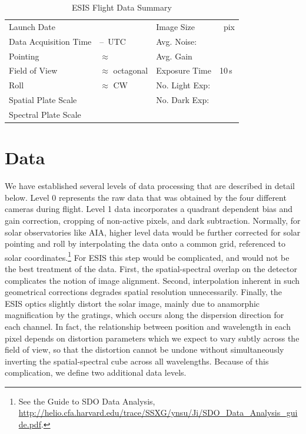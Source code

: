 		\begin{table}
		\begin{center}
			\caption{ESIS Flight Data Summary}
			\label{tab:data_info}
			\begin{tabular}{ll|ll}\hline
				Launch Date & \dateMission & Image Size  & \imageShape~pix\\
				Data Acquisition Time & \timeDataStart--\timeDataStop~UTC & Avg. Noise: & \readoutNoise\tablenotemark{a}\\ 
			    Pointing   &  $\approx$ \esispointing & Avg. Gain &   \gain \\
				Field of View  & $\approx$ \esisfov octagonal  & Exposure Time & 10\,s \\
				Roll & $\approx$ \esisroll CW & No. Light Exp: &\numDataFrames\\
			    Spatial  Plate Scale  &  \plateScale & No. Dark Exp: &\numDarkFrames \\
				Spectral  Plate Scale  &  \dispersion & \\
					\hline
			\end{tabular}
		\end{center}
		\end{table}
		
		



	
\section{Data} 

We have established several levels of data processing that are described in detail below.
Level 0 represents the raw data that was obtained by the four different cameras during flight.
Level 1 data incorporates %
a quadrant dependent bias and gain correction, cropping of non-active pixels, and dark subtraction.
Normally, for solar observatories like AIA, higher level data would be further corrected for solar pointing and roll by interpolating the data onto a common grid, referenced to solar coordinates.\footnote{See the Guide to SDO Data Analysis, \url{http://helio.cfa.harvard.edu/trace/SSXG/ynsu/Ji/SDO_Data_Analysis_guide.pdf}.}  For ESIS this step would be complicated, and would not be the best treatment of the data.  
First, the spatial-spectral overlap on the detector complicates the notion of image alignment. Second, interpolation inherent in such geometrical corrections degrades spatial resolution unnecessarily.  
Finally, the ESIS optics slightly distort the solar image, mainly due to anamorphic magnification by the gratings, which occurs along the dispersion direction for each channel. In fact, the relationship between position and wavelength in each pixel depends on distortion parameters which we expect to vary subtly across the field of view, so that the distortion cannot be undone without simultaneously inverting the spatial-spectral cube across all wavelengths.  Because of this complication, we define two additional data levels.  

